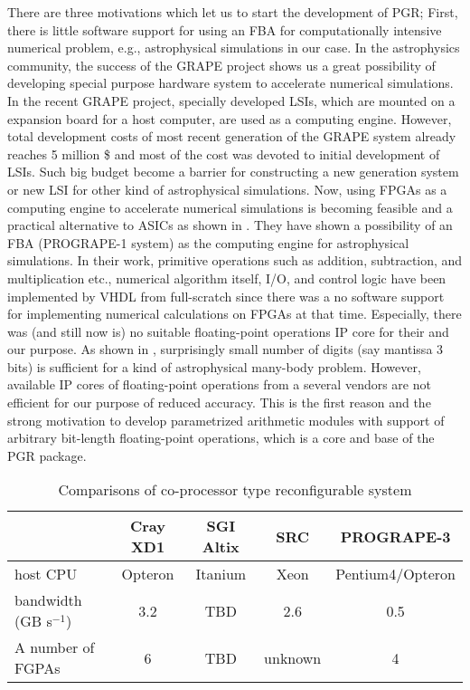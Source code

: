 \documentclass{llncs}
\begin{document}
There are three motivations which let us to start the development of
PGR; First, there is little software support for 
using an FBA for computationally intensive
numerical problem, e.g., astrophysical simulations in our case.
In the astrophysics community, the success of the
GRAPE project \cite{GRAPE} shows us a great possibility of 
developing special purpose hardware system to accelerate 
numerical simulations. In the recent GRAPE project, specially
developed LSIs, which are mounted on a expansion board
for a host computer, are used as a computing engine.
However, total development costs of most recent generation of the
GRAPE system already reaches 5 million \$ and most of the cost
was devoted to initial development of LSIs. 
Such big budget become a barrier for constructing a new generation system
or new LSI for other kind of astrophysical simulations.
Now, using FPGAs as a computing engine 
to accelerate numerical simulations is becoming 
feasible and a practical alternative to ASICs 
as shown in \cite{Hamada2000}.
They have shown a possibility of an FBA (PROGRAPE-1 system)
as the computing engine for astrophysical simulations.
In their work, primitive operations such as addition, subtraction, 
and multiplication etc., numerical algorithm itself, I/O, and control logic
have been implemented by VHDL from full-scratch
since there was a no software support for implementing
numerical calculations on FPGAs at that time.
Especially, there was (and still now is)
no suitable floating-point operations IP core for their and our purpose.
As shown in \cite{Makino1990}, surprisingly small number of digits
(say mantissa 3 bits) is sufficient for a kind of astrophysical many-body problem.
However, available IP cores of floating-point operations
from a several vendors are not efficient for our purpose of reduced accuracy.
This is the first reason and the strong motivation to develop 
parametrized arithmetic modules with support of 
arbitrary bit-length floating-point operations, 
which is a core and base of the PGR package.

\begin{table*}
\caption{Comparisons of co-processor type reconfigurable system}
\begin{center}
\begin{tabular}{lcccc}
\hline
\hline
& Cray XD1 & SGI Altix & SRC  & PROGRAPE-3 \\
\hline
host CPU                & Opteron  & Itanium   & Xeon & Pentium4/Opteron \\
bandwidth (GB s$^{-1}$) & 3.2      & TBD       & 2.6  & 0.5              \\
A number of FGPAs       & 6        & TBD       & unknown & 4             \\
\hline
\hline
\end{tabular}
\end{center}
\label{comparison}
\end{table*}
\end{document}
